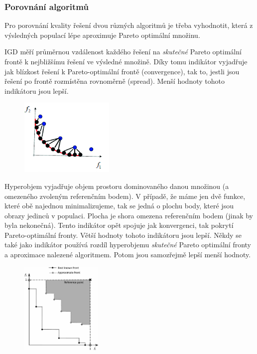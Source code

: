 \subsubsection{Porovnání algoritmů}
Pro porovnání kvality řešení dvou různých algoritmů je třeba vyhodnotit, která z výsledných populací lépe aproximuje Pareto optimální množinu. 
\begin{description}
	\leftskip 40pt
	\setlength{\itemsep}{0pt}
	\item[IGD (Inverted Generational Distance)] IGD měří průměrnou vzdálenost každého řeše\-ní na \textit{skutečné} Pareto optimální frontě k nejbližšímu řešení ve výsledné množině. Díky tomu indikátor vyjadřuje jak blízkost řešení k Pareto-optimální frontě (convergence), tak to, jestli jsou řešení po frontě rozmístěna rovnoměrně (spread). Menší hodnoty tohoto indikátoru jsou lepší. 
	\begin{figure}[H]
		\centering
		\includegraphics[width=0.4\textwidth]{img/igd.png}
	\end{figure}
	
	\item[Hyperobjem (HV -- hypervolume)] Hyperobjem vyjadřuje objem prostoru dominovaného danou množinou (a omezeného zvoleným referenčním bodem). V případě, že máme jen dvě funkce, které obě najednou minimalizujeme, tak se jedná o plochu  body, které jsou obrazy jedinců v populaci. Plocha je shora omezena referenčním bodem (jinak by byla nekonečná). Tento indikátor opět spojuje jak konvergenci, tak pokrytí Pareto-optimální fronty. Větší hodnoty tohoto indikátoru jsou lepší. Někdy se také jako indikátor používá rozdíl hyperobjemu \textit{skutečné} Pareto optimální fronty a aproximace nalezené algoritmem. Potom jsou samozřejmě lepší menší hodnoty.
	\begin{figure}[H]
		\centering
		\includegraphics[width=0.35\textwidth]{img/hypervolume.png}
	\end{figure}
	
\end{description}
